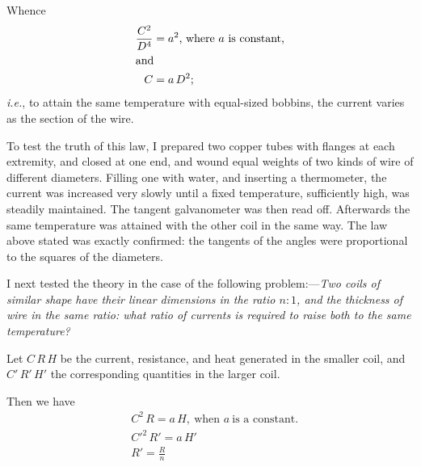 \documentclass[12pt,oneside]{book}[2021/10/04]
\newcommand{\ie}{\textit{i.e.}}
\newenvironment{letlist}{\begin{description}[leftmargin=4em, itemindent=-2em]}{\end{description}}
\begin{document}
Whence
\begin{align*}
\frac{C^2}{D^4} &= a^2 \text{, where \(a\) is constant,}\\
\shortintertext{and}
C &= a\,D^2;
\end{align*}
\ie, to attain the same temperature with equal-sized bobbins, the
current varies as the section of the wire.

To test the truth of this law, I prepared two copper tubes with
flanges at each extremity, and closed at one end, and wound equal
weights of two kinds of wire of different diameters. Filling one
with water, and inserting a thermometer, the current was increased
very slowly until a fixed temperature, sufficiently high, was steadily
maintained. The tangent galvanometer was then read off. Afterwards
the same temperature was attained with the other coil in
the same way. The law above stated was exactly confirmed: the
tangents of the angles were proportional to the squares of the
diameters.

I next tested the theory in the case of the following problem:—\textit{Two
coils of similar shape have their linear dimensions in the
ratio \(n : 1\), and the thickness of wire in the same ratio: what ratio
of currents is required to raise both to the same temperature?}
\begin{letlist}
\item[] Let \(C\,R\,H\) be the current, resistance, and heat generated in
the smaller coil, and \(C'\,R'\,H'\) the corresponding quantities
in the larger coil.
\end{letlist}

Then we have
\begin{align*}
&C^2\,R = a\,H,\ \text{when } a \ \text{is a constant.}\\
&C'^2\,R' = a\,H' \\
&R' = \frac{R}{n}
\end{align*}
\end{document}
